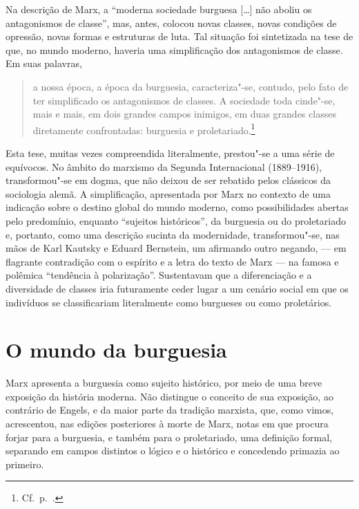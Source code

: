 Na descrição de Marx, a “moderna sociedade burguesa [\ldots{}] não aboliu os
antagonismos de classe”, mas, antes, colocou novas classes, novas
condições de opressão, novas formas e estruturas de luta. Tal situação
foi sintetizada na tese de que, no mundo moderno, haveria uma
simplificação dos antagonismos de classe. Em suas palavras, 

\begin{quote} 
a nossa época, a época da burguesia, caracteriza"-se, contudo, pelo
fato de ter simplificado os antagonismos de classes. A sociedade toda
cinde"-se, mais e mais, em dois grandes campos inimigos, em duas
grandes classes diretamente confrontadas: burguesia e proletariado.\footnote{ Cf.~p.~\pageref{1}.}
\end{quote} 

Esta tese, muitas vezes compreendida literalmente, prestou"-se a uma
série de equívocos. No âmbito do marxismo da Segunda Internacional (1889--1916),
transformou"-se em dogma, que não deixou de ser rebatido pelos
clássicos da sociologia alemã. A simplificação, apresentada por Marx
no contexto de uma indicação sobre o destino global do mundo moderno,
como possibilidades abertas pelo predomínio, enquanto “sujeitos
históricos”, da burguesia ou do proletariado e, portanto, como uma
descrição sucinta da modernidade, transformou"-se, nas mãos de Karl
Kautsky e Eduard Bernstein, um afirmando outro negando, --- em flagrante
contradição com o espírito e a letra do texto de Marx --- na famosa e
polêmica “tendência à polarização”. Sustentavam que a diferenciação e a
diversidade de classes iria futuramente ceder lugar a um cenário social
em que os indivíduos se classificariam literalmente como burgueses
ou como proletários.

\section*{O mundo da burguesia}

Marx apresenta a burguesia como sujeito histórico, por meio de uma breve
exposição da história moderna. Não distingue o conceito de sua
exposição, ao contrário de Engels, e da maior parte da tradição
marxista, que, como vimos, acrescentou, nas edições posteriores à morte
de Marx, notas em que procura forjar para a burguesia, e também para o
proletariado, uma definição formal, separando em campos distintos o
lógico e o histórico e concedendo primazia ao primeiro.

